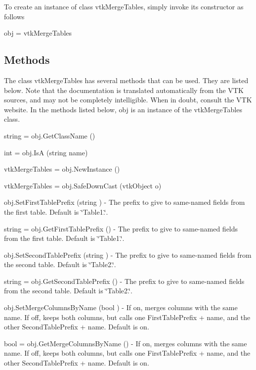 To create an instance of class vtk\-Merge\-Tables, simply invoke its constructor as follows \begin{DoxyVerb}  obj = vtkMergeTables
\end{DoxyVerb}
 \hypertarget{vtkwidgets_vtkxyplotwidget_Methods}{}\subsection{Methods}\label{vtkwidgets_vtkxyplotwidget_Methods}
The class vtk\-Merge\-Tables has several methods that can be used. They are listed below. Note that the documentation is translated automatically from the V\-T\-K sources, and may not be completely intelligible. When in doubt, consult the V\-T\-K website. In the methods listed below, {\ttfamily obj} is an instance of the vtk\-Merge\-Tables class. 
\begin{DoxyItemize}
\item {\ttfamily string = obj.\-Get\-Class\-Name ()}  
\item {\ttfamily int = obj.\-Is\-A (string name)}  
\item {\ttfamily vtk\-Merge\-Tables = obj.\-New\-Instance ()}  
\item {\ttfamily vtk\-Merge\-Tables = obj.\-Safe\-Down\-Cast (vtk\-Object o)}  
\item {\ttfamily obj.\-Set\-First\-Table\-Prefix (string )} -\/ The prefix to give to same-\/named fields from the first table. Default is \char`\"{}\-Table1.\char`\"{}.  
\item {\ttfamily string = obj.\-Get\-First\-Table\-Prefix ()} -\/ The prefix to give to same-\/named fields from the first table. Default is \char`\"{}\-Table1.\char`\"{}.  
\item {\ttfamily obj.\-Set\-Second\-Table\-Prefix (string )} -\/ The prefix to give to same-\/named fields from the second table. Default is \char`\"{}\-Table2.\char`\"{}.  
\item {\ttfamily string = obj.\-Get\-Second\-Table\-Prefix ()} -\/ The prefix to give to same-\/named fields from the second table. Default is \char`\"{}\-Table2.\char`\"{}.  
\item {\ttfamily obj.\-Set\-Merge\-Columns\-By\-Name (bool )} -\/ If on, merges columns with the same name. If off, keeps both columns, but calls one First\-Table\-Prefix + name, and the other Second\-Table\-Prefix + name. Default is on.  
\item {\ttfamily bool = obj.\-Get\-Merge\-Columns\-By\-Name ()} -\/ If on, merges columns with the same name. If off, keeps both columns, but calls one First\-Table\-Prefix + name, and the other Second\-Table\-Prefix + name. Default is on.  

\end{DoxyItemize}
